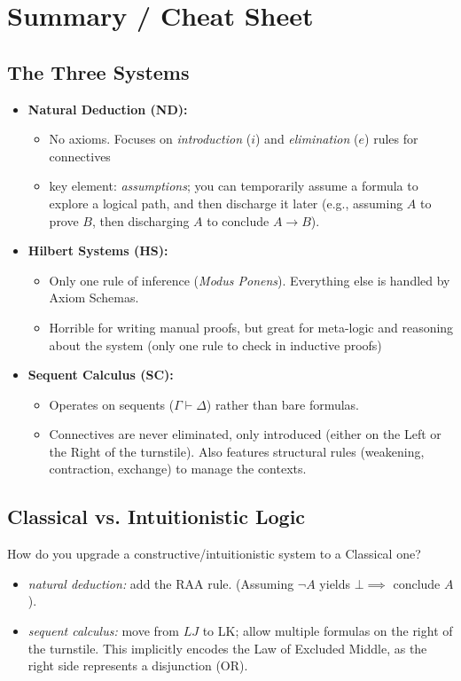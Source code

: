 \documentclass[a4paper, 11pt]{report}
\begin{document}

\section{Summary / Cheat Sheet}

\subsection*{The Three Systems}

\begin{itemize}
    \item \textbf{Natural Deduction (ND):}    
        \begin{itemize}
        \item  No axioms. Focuses on \textit{introduction} ($i$) and \textit{elimination} ($e$) rules for connectives
        \item key element: \textit{assumptions}; you can temporarily assume a formula to explore a logical path, and then discharge it later (e.g., assuming $A$ to prove $B$, then discharging $A$ to conclude $A \to B$).
    \end{itemize}
    
    \item \textbf{Hilbert Systems (HS):}
    \begin{itemize}
        \item Only one rule of inference (\textit{Modus Ponens}). Everything else is handled by Axiom Schemas.
        \item Horrible for writing manual proofs, but great for meta-logic and reasoning about the system (only one rule to check in inductive proofs)
    \end{itemize}

    \item \textbf{Sequent Calculus (SC):}
    \begin{itemize}
        \item Operates on sequents ($\Gamma \vdash \Delta$) rather than bare formulas. 
        \item Connectives are never eliminated, only introduced (either on the Left or the Right of the turnstile). Also features structural rules (weakening, contraction, exchange) to manage the contexts.
    \end{itemize}
\end{itemize}

\subsection*{Classical vs. Intuitionistic Logic}
How do you upgrade a constructive/intuitionistic system to a Classical one?
\begin{itemize}
    \item \textit{natural deduction:} add the RAA rule. (Assuming $\neg A$ yields $\bot \implies$ conclude $A$).
    \item \textit{sequent calculus:} move from $LJ$ to LK; allow multiple formulas on the right of the turnstile. This implicitly encodes the Law of Excluded Middle, as the right side represents a disjunction (OR).
\end{itemize}
\end{document}
